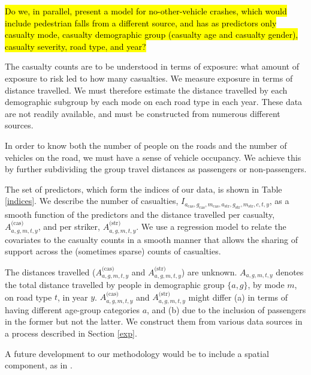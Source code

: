 \documentclass{article}
\begin{document}
\hl{Do we, in parallel, present a model for no-other-vehicle crashes, which would include pedestrian falls from a different source, and has as predictors only casualty mode, casualty demographic group (casualty age and casualty gender), casualty severity, road type, and year?} \citep{Methorst2017,Ward2005}


The casualty counts are to be understood in terms of exposure: what amount of exposure to risk led to how many casualties. We measure exposure in terms of distance travelled. We must therefore estimate the distance travelled by each demographic subgroup by each mode on each road type in each year. These data are not readily available, and must be constructed from numerous different sources.

In order to know both the number of people on the roads and the number of vehicles on the road, we must have a sense of vehicle occupancy. We achieve this by further subdividing the group travel distances as passengers or non-passengers.

The set of predictors, which form the indices of our data, is shown in Table \ref{indices}. We describe the number of casualties, $I_{a_{\text{cas}},g_{\text{cas}},m_{\text{cas}},a_{\text{str}},g_{\text{str}},m_{\text{str}},c,t,y}$, as a smooth function of the predictors and the distance travelled per casualty, $A_{a,g,m,t,y}^{\text{(cas)}}$, and per striker, $A_{a,g,m,t,y}^{\text{(str)}}$. We use a regression model to relate the covariates to the casualty counts in a smooth manner that allows the sharing of support across the (sometimes sparse) counts of casualties. 

The distances travelled ($A_{a,g,m,t,y}^{\text{(cas)}}$ and $A_{a,g,m,t,y}^{\text{(str)}}$) are unknown. $A_{a,g,m,t,y}$ denotes the total distance travelled by people in demographic group $\{a,g\}$, by mode $m$, on road type $t$, in year $y$. $A_{a,g,m,t,y}^{\text{(cas)}}$ and $A_{a,g,m,t,y}^{\text{(str)}}$ might differ (a) in terms of having different age-group categories $a$, and (b) due to the inclusion of passengers in the former but not the latter. We construct them from various data sources in a process described in Section \ref{exp}.

A future development to our methodology would be to include a spatial component, as in \citet{Boulieri2016}. 
\end{document}
